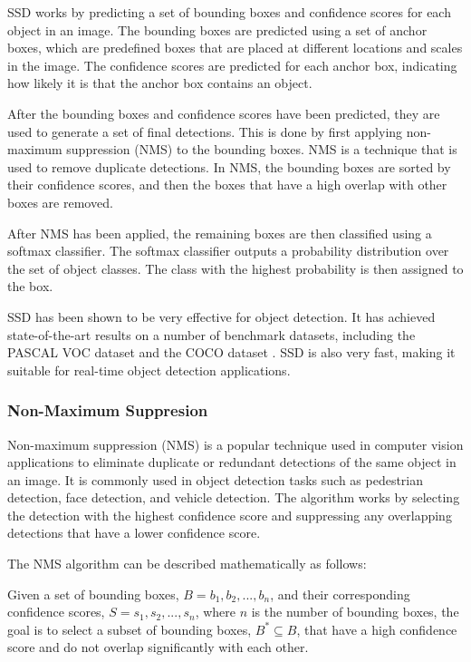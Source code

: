 \documentclass[final,rdr32.tex]{subfiles}
\begin{document}
SSD works by predicting a set of bounding boxes and confidence scores for each object in an image. The bounding boxes are predicted using a set of anchor boxes, which are predefined boxes that are placed at different locations and scales in the image. The confidence scores are predicted for each anchor box, indicating how likely it is that the anchor box contains an object.

After the bounding boxes and confidence scores have been predicted, they are used to generate a set of final detections. This is done by first applying non-maximum suppression (NMS) to the bounding boxes. NMS is a technique that is used to remove duplicate detections. In NMS, the bounding boxes are sorted by their confidence scores, and then the boxes that have a high overlap with other boxes are removed.

After NMS has been applied, the remaining boxes are then classified using a softmax classifier. The softmax classifier outputs a probability distribution over the set of object classes. The class with the highest probability is then assigned to the box.

SSD has been shown to be very effective for object detection. It has achieved state-of-the-art results on a number of benchmark datasets, including the PASCAL VOC dataset \cite{everingham2010pascal} and the COCO dataset \cite{lin2014microsoft}. SSD is also very fast, making it suitable for real-time object detection applications.

\subsubsection{Non-Maximum Suppresion}

Non-maximum suppression (NMS) is a popular technique used in computer vision applications to eliminate duplicate or redundant detections of the same object in an image. It is commonly used in object detection tasks such as pedestrian detection, face detection, and vehicle detection. The algorithm works by selecting the detection with the highest confidence score and suppressing any overlapping detections that have a lower confidence score.

The NMS algorithm can be described mathematically as follows:

Given a set of bounding boxes, $B = {b_1, b_2, ..., b_n}$, and their corresponding confidence scores, $S = {s_1, s_2, ..., s_n}$, where $n$ is the number of bounding boxes, the goal is to select a subset of bounding boxes, $B^* \subseteq B$, that have a high confidence score and do not overlap significantly with each other.
\end{document}
